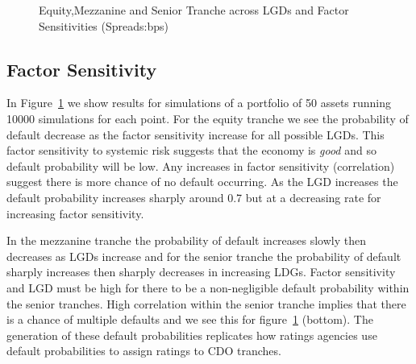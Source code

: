 \begin{figure}
\centerline{}
\caption{\label{fig:Unknown copula density}Equity,Mezzanine and Senior Tranche across LGDs and Factor Sensitivities (Spreads:bps)}
\end{figure}

\subsection{Factor Sensitivity}

In Figure~\ref{fig:Unknown copula density} we show results for simulations of a portfolio of 50 assets running 10000 simulations for each point. For the equity tranche we see the probability of default decrease as the factor sensitivity increase for all possible LGDs. This factor sensitivity to systemic risk suggests that the economy is {\em good} and so default probability will be low. Any increases in factor sensitivity (correlation) suggest there is more chance of no default occurring. As the LGD increases the default probability increases sharply around 0.7 but at a decreasing rate for increasing factor sensitivity.

 In the mezzanine tranche the probability of default increases slowly then decreases as LGDs increase and for the senior tranche the probability of default sharply increases then sharply decreases in increasing LDGs.  Factor sensitivity and LGD must be high for there to be a non-negligible default probability within the senior tranches. High correlation within the senior tranche implies that there is a chance of multiple defaults and we see this for figure~\ref{fig:Unknown copula density} (bottom).  The generation of these default probabilities replicates how ratings agencies use default probabilities to assign ratings to CDO tranches.




